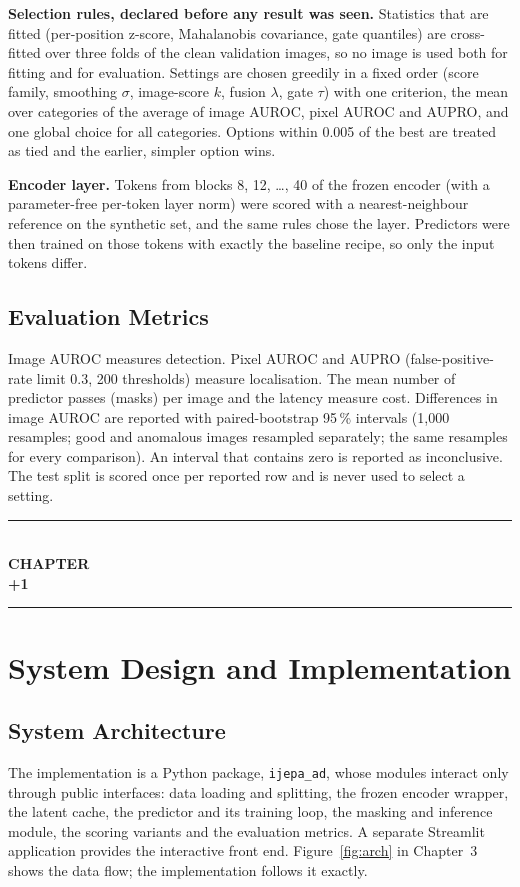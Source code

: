 \documentclass[12pt,a4paper,oneside]{report}
\newcommand{\chapterseparator}{
    \clearpage
    \thispagestyle{empty}
    \begin{center}
        \vspace*{5cm}
        \rule{0.65\textwidth}{0.5pt}\\[1.2cm]
        {\fontsize{16}{20}\selectfont\bfseries CHAPTER}\\[0.8cm]
        {\fontsize{24}{28}\selectfont\bfseries \the\numexpr\value{chapter}+1\relax}\\[1.2cm]
        \rule{0.65\textwidth}{0.5pt}
    \end{center}
    \clearpage
}
\begin{document}
\textbf{Selection rules, declared before any result was seen.} Statistics
that are fitted (per-position z-score, Mahalanobis covariance, gate
quantiles) are cross-fitted over three folds of the clean validation images,
so no image is used both for fitting and for evaluation. Settings are chosen
greedily in a fixed order (score family, smoothing $\sigma$, image-score $k$,
fusion $\lambda$, gate $\tau$) with one criterion, the mean over categories
of the average of image AUROC, pixel AUROC and AUPRO, and one global choice
for all categories. Options within 0.005 of the best are treated as tied and
the earlier, simpler option wins.

\textbf{Encoder layer.} Tokens from blocks 8, 12, \dots, 40 of the frozen
encoder (with a parameter-free per-token layer norm) were scored with a
nearest-neighbour reference on the synthetic set, and the same rules chose
the layer. Predictors were then trained on those tokens with exactly the
baseline recipe, so only the input tokens differ.

\section{Evaluation Metrics}

Image AUROC measures detection. Pixel AUROC and AUPRO (false-positive-rate
limit 0.3, 200 thresholds) measure localisation. The mean number of predictor
passes (masks) per image and the latency measure cost. Differences in image
AUROC are reported with paired-bootstrap 95\,\% intervals (1,000 resamples;
good and anomalous images resampled separately; the same resamples for every
comparison). An interval that contains zero is reported as inconclusive.
The test split is scored once per reported row and is never used to select a
setting.

\chapterseparator
\chapter{System Design and Implementation}

\section{System Architecture}

The implementation is a Python package, \texttt{ijepa\_ad}, whose modules
interact only through public interfaces: data loading and splitting, the
frozen encoder wrapper, the latent cache, the predictor and its training
loop, the masking and inference module, the scoring variants and the
evaluation metrics. A separate Streamlit application provides the
interactive front end. Figure~\ref{fig:arch} in Chapter~3 shows the data
flow; the implementation follows it exactly.
\end{document}
